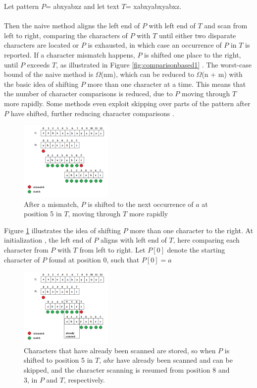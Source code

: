 \documentclass[12pt]{article} %
\begin{document}
Let pattern $P$=  abxyabxz and let text $T$= xabxyabxyabxz.
\\ \\
Then the naive method aligns the left end of $P$  with left end of $T$ and scan from left to right, comparing the characters of $P$ with $T$ until either two disparate characters are located or $P$ is exhausted, in which case an occurrence of $P$ in $T$ is reported. If a character mismatch happens, $P$ is shifted one place to the right, until $P$ exceeds $T$, as illustrated in Figure \ref{fig:comparisonbased1} \cite{gusfield}.
The worst-case bound of the naive method is $\Omega$(nm), which can be reduced to $\Omega$(n + m) with the basic idea of shifting $P$ more than one character at a time. This means that the number of character comparisons is reduced, due to $P$ moving through $T$ more rapidly. Some methods even exploit skipping over parts of the pattern after $P$ have shifted, further reducing character comparisons \cite{gusfield}. 
\begin{figure}[H]
    \centering
    \includegraphics[width=0.4\textwidth]{comparisonbased2}
    \captionsetup{width=0.8\textwidth}
    \caption{After a mismatch, $P$ is shifted to the next occurrence of $a$ at position 5 in $T$, moving through $T$ more rapidly}
    \label{fig:comparisonbased2}
\end{figure}
\newline   
Figure \ref{fig:comparisonbased2}  illustrates the idea of shifting $P$ more than one character to the right. At initialization , the left end of $P$ aligns with left end of $T$, here comparing each character from $P$ with $T$ from left to right.
\newline
Let $P[0]$ denote the starting character of $P$ found at position 0, such that $P[0]=a$
\newline
\begin{figure}[H]
    \centering
    \includegraphics[width=0.4\textwidth]{comparisonbased3}
    \captionsetup{width=0.8\textwidth}
    \caption{Characters that have already been scanned are stored, so when $P$ is shifted to position 5 in $T$, $abx$ have already been scanned and can be skipped, and the character scanning is resumed from position 8 and 3, in $P$ and $T$, respectively.}
    \label{fig:comparisonbased3}
\end{figure}
\end{document}
